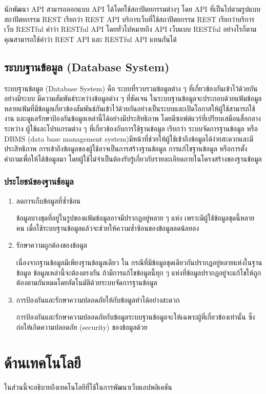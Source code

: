 นักพัฒนา API สามารถออกแบบ API ได้โดยใช้สถาปัตยกรรมต่างๆ โดย API ที่เป็นไปตามรูปแบบสถาปัตยกรรม REST เรียกว่า REST API บริการเว็บที่ใช้สถาปัตยกรรม REST เรียกว่าบริการเว็บ RESTful คำว่า RESTful API โดยทั่วไปหมายถึง API เว็บแบบ RESTful อย่างไรก็ตาม คุณสามารถใช้คำว่า REST API และ RESTful API แทนกันได้
\subsection{ระบบฐานข้อมูล (Database System)}
ระบบฐานข้อมูล (Database System) \cite{web:database} คือ ระบบที่รวบรวมข้อมูลต่าง ๆ ที่เกี่ยวข้องกันเข้าไว้ด้วยกันอย่างมีระบบ มีความสัมพันธ์ระหว่างข้อมูลต่าง ๆ ที่ชัดเจน ในระบบฐานข้อมูลจะประกอบด้วยแฟ้มข้อมูลหลายแฟ้มที่มีข้อมูลเกี่ยวข้องสัมพันธ์กันเข้าไว้ด้วยกันอย่างเป็นระบบและเปิดโอกาสให้ผู้ใช้สามารถใช้งาน
และดูแลรักษาป้องกันข้อมูลเหล่านี้ได้อย่างมีประสิทธิภาพ โดยมีซอฟต์แวร์ที่เปรียบเสมือนสื่อกลางระหว่าง
ผู้ใช้และโปรแกรมต่าง ๆ ที่เกี่ยวข้องกับการใช้ฐานข้อมูล เรียกว่า ระบบจัดการฐานข้อมูล หรือ DBMS (data base management system)มีหน้าที่ช่วยให้ผู้ใช้เข้าถึงข้อมูลได้ง่ายสะดวกและมีประสิทธิภาพ การเข้าถึงข้อมูลของผู้ใช้อาจเป็นการสร้างฐานข้อมูล การแก้ไขฐานข้อมูล หรือการตั้งคำถามเพื่อให้ได้ข้อมูลมา โดยผู้ใช้ไม่จำเป็นต้องรับรู้เกี่ยวกับรายละเอียดภายในโครงสร้างของฐานข้อมูล
\subsubsection{ประโยชน์ของฐานข้อมูล}
\begin{enumerate}
    \item ลดการเก็บข้อมูลที่ซ้ำซ้อน

          ข้อมูลบางชุดที่อยู่ในรูปของแฟ้มข้อมูลอาจมีปรากฏอยู่หลาย ๆ แห่ง เพราะมีผู้ใช้ข้อมูลชุดนี้หลายคน เมื่อใช้ระบบฐานข้อมูลแล้วจะช่วยให้ความซ้ำซ้อนของข้อมูลลดน้อยลง
    \item รักษาความถูกต้องของข้อมูล

          เนื่องจากฐานข้อมูลมีเพียงฐานข้อมูลเดียว ใน
          กรณีที่มีข้อมูลชุดเดียวกันปรากฏอยู่หลายแห่งในฐานข้อมูล ข้อมูลเหล่านี้จะต้องตรงกัน ถ้ามีการแก้ไขข้อมูลนี้ทุก ๆ แห่งที่ข้อมูลปรากฏอยู่จะแก้ไขให้ถูกต้องตามกันหมดโดยอัตโนมัติด้วยระบบจัดการฐานข้อมูล
    \item การป้องกันและรักษาความปลอดภัยให้กับข้อมูลทำได้อย่างสะดวก

          การป้องกันและรักษาความปลอดภัยกับข้อมูลระบบฐานข้อมูลจะให้เฉพาะผู้ที่เกี่ยวข้องเท่านั้น
          ซึ่งก่อให้เกิดความปลอดภัย (security) ของข้อมูลด้วย
\end{enumerate}
\section{ด้านเทคโนโลยี}
ในส่วนนี้จะอธิบายถึงเทคโนโลยีที่ใช้ในการพัฒนาเว็บแอปพลิเคชัน


